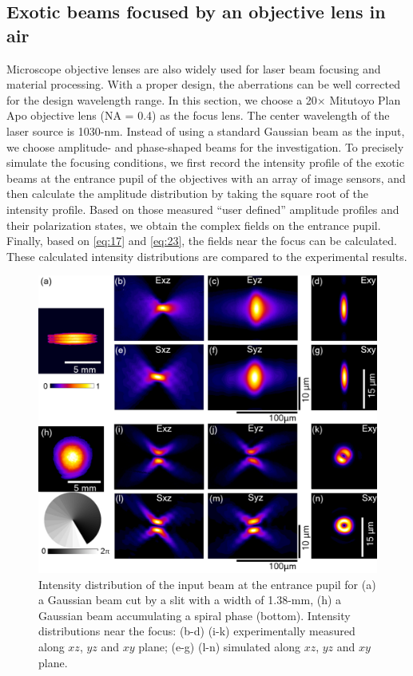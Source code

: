 \documentclass[9pt,twocolumn,twoside]{osajnl}
\begin{document}
\subsection{Exotic beams focused by an objective lens in air}
Microscope objective lenses are also widely used for laser beam focusing and material processing. With a proper design, the aberrations can be well corrected for the design wavelength range. In this section, we choose a 20$\times$ Mitutoyo Plan Apo objective lens (NA = 0.4) as the focus lens. The center wavelength of the laser source is 1030-nm. Instead of using a standard Gaussian beam as the input, we choose amplitude- and phase-shaped beams for the investigation. To precisely simulate the focusing conditions, we first record the intensity profile of the exotic beams at the entrance pupil of the objectives with an array of image sensors, and then calculate the amplitude distribution by taking the square root of the intensity profile. Based on those measured ``user defined'' amplitude profiles and their polarization states, we obtain the complex fields on the entrance pupil. Finally, based on \eqref{eq:17} and \eqref{eq:23}, the fields near the focus can be calculated. These calculated intensity distributions are compared to the experimental results. 

\begin{figure}
	\centering
	\includegraphics[width=\linewidth]{../AppOptics/figures/20xairExotic.pdf}
	\caption{Intensity distribution of the input beam at the entrance pupil for (a) a Gaussian beam cut by a slit with a width of 1.38-mm, (h) a Gaussian beam accumulating a spiral phase (bottom). Intensity distributions near the focus: (b-d) (i-k) experimentally measured along $xz$, $yz$ and $xy$ plane; (e-g) (l-n) simulated along $xz$, $yz$ and $xy$ plane.}\label{fig:4}
\end{figure}
\end{document}

